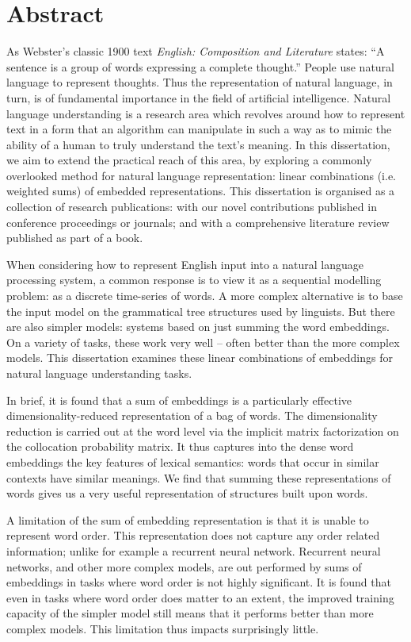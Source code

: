 \documentclass{book}
\begin{document}
\chapter*{Abstract}
As Webster's classic 1900 text \textit{English: Composition and Literature} states:
``A sentence is a group of words expressing a complete thought.''
People use natural language to represent thoughts.
Thus the representation of natural language, in turn, is of fundamental importance in the field of artificial intelligence.
Natural language understanding is a research area which  revolves around how to represent text in a form that an algorithm can manipulate in such a way as to mimic the ability of a human to truly understand the text's meaning.
In this dissertation, we aim to extend the practical reach of this area,
by exploring a commonly overlooked method for natural language representation: linear combinations (i.e. weighted sums) of embedded representations.
This dissertation is organised as a collection of research publications:
 with our novel contributions published in conference proceedings or journals;
 and with a comprehensive literature review published as part of a book.

When considering how to represent English input into a natural language processing system,
a common response is to view it as a sequential modelling problem: as a discrete time-series of words.
A more complex alternative is to base the input model on the grammatical tree structures used by linguists.
But there are also simpler models: systems based on just summing the word embeddings.
On a variety of tasks, these work very well -- often better than the more complex models.
This dissertation examines these linear combinations of embeddings for natural language understanding tasks.

In brief, it is found that a sum of embeddings is a particularly effective dimensionality-reduced representation of a bag of words.
The dimensionality reduction is carried out at the word level via the implicit matrix factorization 
on the collocation probability matrix.
It thus captures into the dense word embeddings the key features of lexical semantics:
words that occur in similar contexts have similar meanings.
We find that summing these representations of words gives us a very useful representation of structures built upon words.

A limitation of the sum of embedding representation is that it is unable to represent word order.
This representation does not capture any order related information; unlike for example a recurrent neural network.
Recurrent neural networks, and other more complex models, are out performed by sums of embeddings in tasks where word order is not highly significant.
It is found that even in tasks where word order does matter to an extent, the improved training capacity of the simpler model still means that it performs better than more complex models.
This limitation thus impacts surprisingly little.
\end{document}
